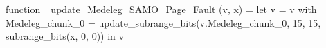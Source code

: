 function _update_Medeleg_SAMO_Page_Fault (v, x) = let v = { v with Medeleg_chunk_0 = update_subrange_bits(v.Medeleg_chunk_0, 15, 15, subrange_bits(x, 0, 0)) } in
  v
